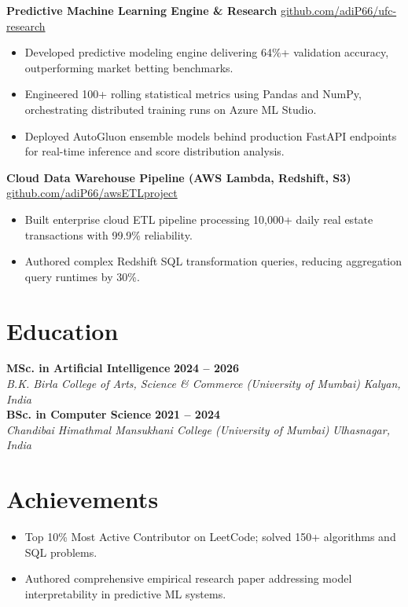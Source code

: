 \documentclass[10pt,a4paper]{article}
\begin{document}
\textbf{Predictive Machine Learning Engine \& Research} \hfill \href{https://github.com/adiP66/ufc-research}{github.com/adiP66/ufc-research}
\begin{itemize}
    \item Developed predictive modeling engine delivering 64\%+ validation accuracy, outperforming market betting benchmarks.
    \item Engineered 100+ rolling statistical metrics using Pandas and NumPy, orchestrating distributed training runs on Azure ML Studio.
    \item Deployed AutoGluon ensemble models behind production FastAPI endpoints for real-time inference and score distribution analysis.
\end{itemize}

\textbf{Cloud Data Warehouse Pipeline (AWS Lambda, Redshift, S3)} \hfill \href{https://github.com/adiP66/awsETLproject}{github.com/adiP66/awsETLproject}
\begin{itemize}
    \item Built enterprise cloud ETL pipeline processing 10,000+ daily real estate transactions with 99.9\% reliability.
    \item Authored complex Redshift SQL transformation queries, reducing aggregation query runtimes by 30\%.
\end{itemize}

\section*{Education}
\textbf{MSc. in Artificial Intelligence} \hfill \textbf{2024 -- 2026} \\
\textit{B.K. Birla College of Arts, Science \& Commerce (University of Mumbai)} \hfill \textit{Kalyan, India} \\[3pt]
\textbf{BSc. in Computer Science} \hfill \textbf{2021 -- 2024} \\
\textit{Chandibai Himathmal Mansukhani College (University of Mumbai)} \hfill \textit{Ulhasnagar, India}

\section*{Achievements}
\begin{itemize}
    \item Top 10\% Most Active Contributor on LeetCode; solved 150+ algorithms and SQL problems.
    \item Authored comprehensive empirical research paper addressing model interpretability in predictive ML systems.
\end{itemize}
\end{document}
